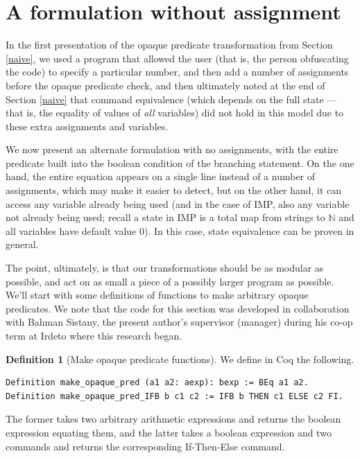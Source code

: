 \documentclass[12pt,notitlepage]{report}
\theoremstyle{plain}
\theoremstyle{definition}
\newtheorem{defin}[theo]{Definition}
\newcommand\N{\mathbb{N}}
\numberwithin{equation}{section}
\begin{document}
\section{A formulation without assignment}\label{noass}
In the first presentation of the opaque predicate transformation from Section \ref{naive}, we used a program that allowed
the user (that is, the person obfuscating the code) to specify a particular number, and then add a number of assignments before the
opaque predicate check, and then ultimately noted at the end of Section \ref{naive} that command equivalence (which depends on the full state --- that is, the equality of values of \emph{all} variables) did not
hold in this model due to these extra assignments and variables.
\par
We now present an alternate formulation with no assignments, with the entire predicate
built into the boolean condition of the branching statement. On the one hand, the entire
equation appears on a single line instead of a number of assignments, which may make it
easier to detect, but on the other hand, it can access any variable already being used (and
in the case of IMP, also any variable not already being used; recall a state in IMP is a total map
from strings to $\N$ and all variables have default value 0).  In this case, state equivalence can be proven in general.
\par
The point, ultimately, is that our transformations should be as modular as possible, and act on as small a piece of a possibly larger program as possible.  We'll start with some definitions of functions to make arbitrary opaque predicates.  We note that the code for this section was developed in collaboration with Bahman Sistany, the present author's supervisor (manager) during his co-op term at Irdeto where this research began. 

\begin{defin}[Make opaque predicate functions]
We define in Coq the following.
\begin{verbatim}
Definition make_opaque_pred (a1 a2: aexp): bexp := BEq a1 a2.
Definition make_opaque_pred_IFB b c1 c2 := IFB b THEN c1 ELSE c2 FI.
\end{verbatim}
The former takes two arbitrary arithmetic expressions and returns the boolean expression equating them, and the latter takes a boolean expression and two commands and returns the corresponding If-Then-Else command.
\end{defin}
\end{document}
